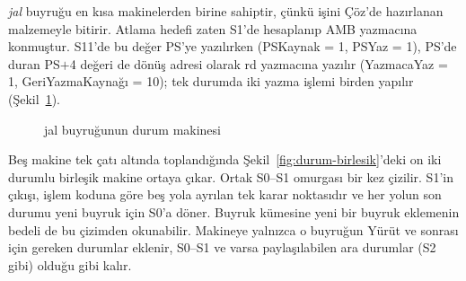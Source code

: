 \emph{jal} buyruğu en kısa makinelerden birine sahiptir, çünkü işini Çöz'de hazırlanan malzemeyle bitirir. Atlama hedefi zaten S1'de hesaplanıp AMB yazmacına konmuştur. S11'de bu değer PS'ye yazılırken (PSKaynak = 1, PSYaz = 1), PS'de duran PS$+$4 değeri de dönüş adresi olarak rd yazmacına yazılır (YazmacaYaz = 1, GeriYazmaKaynağı = 10); tek durumda iki yazma işlemi birden yapılır (Şekil~\ref{fig:durum-jal}).

\begin{figure}[htbp]
\centering
{}
\caption{jal buyruğunun durum makinesi}
\label{fig:durum-jal}
\end{figure}

Beş makine tek çatı altında toplandığında Şekil~\ref{fig:durum-birlesik}'deki on iki durumlu birleşik makine ortaya çıkar. Ortak S0--S1 omurgası bir kez çizilir. S1'in çıkışı, işlem koduna göre beş yola ayrılan tek karar noktasıdır ve her yolun son durumu yeni buyruk için S0'a döner. Buyruk kümesine yeni bir buyruk eklemenin bedeli de bu çizimden okunabilir. Makineye yalnızca o buyruğun Yürüt ve sonrası için gereken durumlar eklenir, S0--S1 ve varsa paylaşılabilen ara durumlar (S2 gibi) olduğu gibi kalır.

